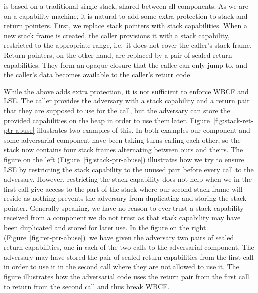 \documentclass[acmsmall,review,anonymous]{acmart}\settopmatter{printfolios=true,printccs=false,printacmref=false}
\begin{document}
\stktokens{} is based on a traditional single stack, shared between all components.
As we are on a capability machine, it is natural to add some extra protection to stack and return pointers.
First, we replace stack pointers with stack capabilities.
When a new stack frame is created, the caller provisions it with a stack capability, restricted to the appropriate range, i.e.\ it does not cover the caller's stack frame.
Return pointers, on the other hand, are replaced by a pair of sealed return capabilities.
They form an opaque closure that the callee can only jump to, and the caller's data becomes available to the caller's return code. 

While the above adds extra protection, it is not sufficient to enforce WBCF and LSE.
The caller provides the adversary with a stack capability and a return pair that they are supposed to use for the call, but the adversary can store the provided capabilities on the heap in order to use them later.
Figure~\ref{fig:stack-ret-ptr-abuse} illustrates two examples of this.
In both examples our component and some adversarial component have been taking turns calling each other, so the stack now contains four stack frames alternating between ours and theirs.
The figure on the left (Figure~\ref{fig:stack-ptr-abuse}) illustrates how we try to ensure LSE by restricting the stack capability to the unused part before every call to the adversary.
However, restricting the stack capability does not help when we in the first call give access to the part of the stack where our second stack frame will reside as nothing prevents the adversary from duplicating and storing the stack pointer.
Generally speaking, we have no reason to ever trust a stack capability received from a component we do not trust as that stack capability may have been duplicated and stored for later use.
In the figure on the right (Figure~\ref{fig:ret-ptr-abuse}), we have given the adversary two pairs of sealed return capabilities, one in each of the two calls to the adversarial component.
The adversary may have stored the pair of sealed return capabilities from the first call in order to use it in the second call where they are not allowed to use it.
The figure illustrates how the adversarial code uses the return pair from the first call to return from the second call and thus break WBCF.
\end{document}
